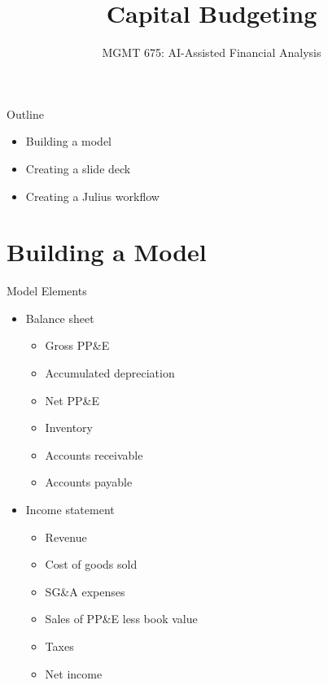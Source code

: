 \documentclass[10pt]{beamer}
\title{Capital Budgeting}
\subtitle{MGMT 675: AI-Assisted Financial Analysis}
\date{}
\begin{document}
\begin{frame}[plain]
\titlepage
\end{frame}

\begin{frame}{Outline}
\begin{itemize}
\item Building a model
\item Creating a slide deck
\item Creating a Julius workflow
\end{itemize}
\end{frame}

\section{Building a Model}

\begin{frame}{Model Elements}

    \begin{itemize}
        \item Balance sheet
    \begin{itemize}
        \item Gross PP\&E
        \item Accumulated depreciation
        \item Net PP\&E
        \item Inventory
        \item Accounts receivable
        \item Accounts payable
    \end{itemize}
    \item Income statement
    \begin{itemize}
        \item Revenue
        \item Cost of goods sold
        \item SG\&A expenses
        \item Sales of PP\&E less book value
        \item Taxes
        \item Net income
    \end{itemize}
    \end{itemize}
\end{frame}
\end{document}
